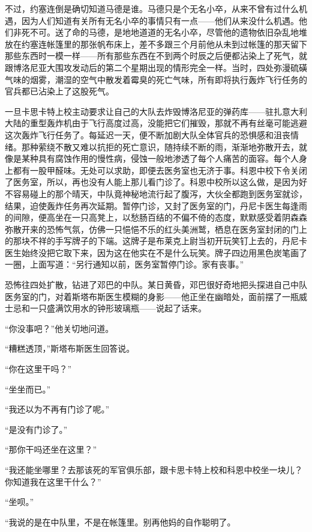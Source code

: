     不过，约塞连倒是确切知道马德是谁。马德只是个无名小卒，从来不曾有过什么机遇，因为人们知道有关所有无名小卒的事情只有一点——他们从来没什么机遇。他们非死不可。送了命的马德，是地地道道的无名小卒，尽管他的遗物依旧杂乱地堆放在约塞连帐篷里的那张帆布床上，差不多跟三个月前他从未到过帐篷的那天留下那些东西时一模一样——所有那些东西在不到两个时辰之后便都沾染上了死气，就跟博洛尼亚大围攻发动后的第二个星期出现的情形完全一样。当时，四处弥漫硫磺气味的烟雾，潮湿的空气中散发着霉臭的死亡气味，所有即将执行轰炸飞行任务的官兵都已沾染上了这股死气。
 


    一旦卡思卡特上校主动要求让自己的大队去炸毁博洛尼亚的弹药库——驻扎意大利大陆的重型轰炸机由于飞行高度过高，没能把它们摧毁，那就不再有丝毫可能逃避这次轰炸飞行任务了。每延迟一天，便不断加剧大队全体官兵的恐惧感和沮丧情绪。那种萦绕不散又难以抗拒的死亡意识，随持续不断的雨，渐渐地弥散开去，就像是某种具有腐蚀作用的慢性病，侵蚀一般地渗透了每个人痛苦的面容。每个人身上都有一股甲醛味。无处可以求助，即便去医务室也无济于事。科恩中校下令关闭了医务室，所以，再也没有人能上那儿看门诊了。科恩中校所以这么做，是因为好不容易碰上的那个晴天，中队竟神秘地流行起了腹泻，大伙全都跑到医务室就诊，结果，迫使轰炸任务再次延期。暂停门诊，又封了医务室的门，丹尼卡医生每逢雨的间隙，便高坐在一只高凳上，以愁肠百结的不偏不倚的态度，默默感受着阴森森弥散开来的恐怖气氛，仿佛一只悒悒不乐的红头美洲鹫，栖息在医务室封闭的门上的那块不祥的手写牌子的下端。这牌子是布莱克上尉当初开玩笑钉上去的，丹尼卡医生始终没把它取下来，因为这在他实在不是什么玩笑。牌子四边用黑色炭笔画了一圈，上面写道：“另行通知以前，医务室暂停门诊。家有丧事。”

    恐怖往四处扩散，钻进了邓巴的中队。某日黄昏，邓巴很好奇地把头探进自己中队医务室的门，对着斯塔布斯医生模糊的身影——他正坐在幽暗处，面前摆了一瓶威士忌和一只盛满饮用水的钟形玻璃瓶——说起了话来。

    “你没事吧？”他关切地问道。

    “糟糕透顶，”斯塔布斯医生回答说。

    “你在这里干吗？”

    “坐坐而已。”

    “我还以为不再有门诊了呢。”

    “是没有门诊了。”

    “那你干吗还坐在这里？”

    “我还能坐哪里？去那该死的军官俱乐部，跟卡思卡特上校和科恩中校坐一块儿？你知道我在这里干什么？”

    “坐呗。”

    “我说的是在中队里，不是在帐篷里。别再他妈的自作聪明了。

